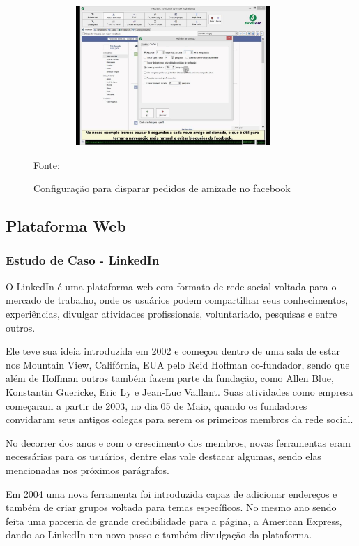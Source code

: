 \begin{figure}[!h]
	\centering
	\caption{Configuração para disparar pedidos de amizade no facebook}
	\includegraphics[width=400px, height=200px]{./images/housoft1.jpg}
	\par {Fonte: \cite{housoft}}
\end{figure}

\newpage

\subsection{Plataforma Web}

\subsubsection{Estudo de Caso - LinkedIn}

O LinkedIn é uma plataforma web com formato de rede social voltada para o mercado de trabalho, onde os usuários podem compartilhar seus conhecimentos, experiências, divulgar atividades profissionais, voluntariado, pesquisas e entre outros. 

Ele teve sua ideia introduzida em 2002 e começou dentro de uma sala de estar nos Mountain View, Califórnia, EUA pelo Reid Hoffman co-fundador, sendo que além de Hoffman outros também fazem parte da fundação, como Allen Blue, Konstantin Guericke, Eric Ly e Jean-Luc Vaillant. Suas atividades como empresa começaram a partir de 2003, no dia 05 de Maio, quando os fundadores convidaram seus antigos colegas para serem os primeiros membros da rede social.

No decorrer dos anos e com o crescimento dos membros, novas ferramentas eram necessárias para os usuários, dentre elas vale destacar algumas, sendo elas mencionadas nos próximos parágrafos.

Em 2004 uma nova ferramenta foi introduzida capaz de adicionar endereços e também de criar grupos voltada para temas específicos. No mesmo ano sendo feita uma parceria de grande credibilidade para a página, a American Express, dando ao LinkedIn um novo passo e também divulgação da plataforma. 

